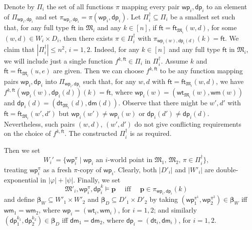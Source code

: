 \documentclass{lmcs} %
\theoremstyle{plain}\newtheorem{satz}[thm]{Satz} %
\newcommand{\wt}{\mathsf{wt}}
\newcommand{\dt}{\mathsf{dt}}
\newcommand{\ft}{\mathsf{ft}}
\newcommand{\wm}{\mathsf{wm}}
\newcommand{\dm}{\mathsf{dm}}
\newcommand{\iwp}{\mathsf{wp}_i}
\newcommand{\idp}{\mathsf{dp}_i}
\newcommand{\owp}{\mathsf{wp}_1}
\newcommand{\twp}{\mathsf{wp}_2}
\newcommand{\odp}{\mathsf{dp}_1}
\newcommand{\tdp}{\mathsf{dp}_2}
\newcommand{\bs}{\boldsymbol{\beta}}
\newcommand{\fform}[1]{\boldsymbol{#1}}
\newcommand{\pvar}{\fform{p}}
\begin{document}
Denote by $\Pi_{i}$ the set of all functions $\pi$ mapping every pair $\iwp,\idp$ to an element of $\Pi_{\iwp,\idp}$ and set $\pi_{\iwp,\idp}=\pi(\iwp,\idp)$.  
Let $\Pi_{i}^{\dag}\subseteq \Pi_{i}$ be a smallest set such that, for any full type $\ft$ in $\mathfrak M_i$ and any $k\in [n]$, if 
$\ft=\ft_{\mathfrak M_i}(w,d)$, for some $(w,d)\in W_i\times D_i$, then there exists $\pi\in \Pi_{i}^{\dag}$ with 
$\pi_{\iwp(w),\idp(d)}(k) = \ft$. 
%
We claim that $|\Pi^{\dag}_i|\leq n^{2}$, $i=1,2$. Indeed, for any $k\in [n]$ and any full type $\ft$ in $\mathfrak{M}_i$,  
we will include just a single function $f^{k,\ft}\in \Pi_i$ in $\Pi^\dag_i$.
Assume $k$ and $\ft=\ft_{\mathfrak{M}_i}(u,e)$ are given. Then we can choose $f^{k,\ft}$ to be any function mapping pairs $\iwp,\idp$ into $\Pi_{\iwp,\idp}$ such that, for any $w,d$ with $\ft=\ft_{\mathfrak{M}_{i}}(w,d)$,  we have  $f^{k,\ft}(\iwp(w),\idp(d))(k)=\ft$, where $\iwp(w)=(\wt_{\mathfrak{M}_{i}}(w),\wm(w))$ and
$\idp(d)=(\dt_{\mathfrak{M}_{i}}(d),\dm(d))$.
 Observe that there might be $w',d'$ with $\ft=\ft_{\mathfrak{M}_{i}}(w',d')$ but $\iwp(w')\not=\iwp(w)$
or $\idp(d')\not=\idp(d)$. Nevertheless, such pairs $(w,d)$, $(w',d')$ do not give conflicting requirements on the choice of $f^{k,\ft}$.
The constructed $\Pi^{\dag}_i$ is as required.

	
Then we set
%
\begin{equation*}
W_{i}' = \{ \iwp^\pi \mid \iwp \text{ an $i$-world point in $\mathfrak{M}_{1}$, $\mathfrak{M}_{2}$, $\pi \in \Pi_{i}^{\dag}$}\}, 
\end{equation*}
%
treating $\iwp^\pi$ as a fresh $\pi$-copy of $\iwp$. Clearly, both $|D'_i|$ and $|W'_i|$ are double-exponential in $|\varphi|+|\psi|$. 
%
Finally, we set 
%
\begin{equation}\label{models}
\mathfrak M'_i, \iwp^\pi, \idp^k \models \pvar \quad \text{ iff } \quad \pvar \in \pi_{\iwp,\idp}(k)
\end{equation}
%
and define $\bs_W \subseteq W'_1 \times W'_2$ and $\bs_D \subseteq D'_1 \times D'_2$ by taking 
%
$(\owp^{\pi^1}, \twp^{\pi^2})\in\bs_W$ iff $\wm_1 = \wm_2$, where $\iwp = (\wt_i, \wm_i)$, for $i=1,2$; and similarly   
%
$(\odp^{k_1}, \tdp^{k_2})\in\bs_D$ iff $\dm_1 = \dm_2$, where $\idp = (\dt_i, \dm_i)$, for $i=1,2$.
\end{document}
